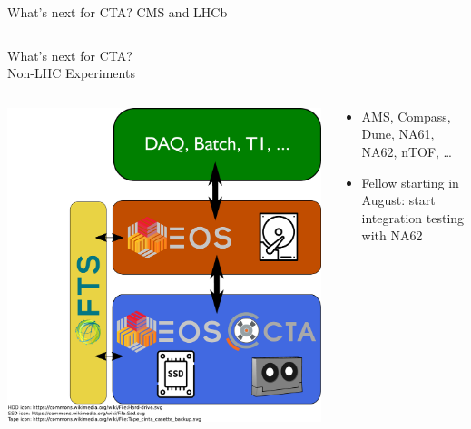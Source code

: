\documentclass[aspectratio=1610]{beamer}
\begin{document}
\begin{frame}{What's next for CTA? CMS and LHCb}
\begin{columns}
\begin{column}{0.4\textwidth}
\begin{center}
		\end{center}
	\end{column}
\end{columns}
\end{frame}

\begin{frame}{What's next for CTA?\\
   Non-LHC Experiments}
\begin{columns}
	\begin{column}{0.4\textwidth}
		\begin{center}
		  \includegraphics[width=\textwidth]{images/CTA_Deployment_small}
		\end{center}
	\end{column}
	\begin{column}{0.55\textwidth}
      \begin{itemize}
      \item AMS, Compass, Dune, NA61, NA62, nTOF, \ldots
      \item Fellow starting in August: start integration testing with NA62
      \end{itemize}
	\end{column}
\end{columns}
\end{frame}
\end{document}
